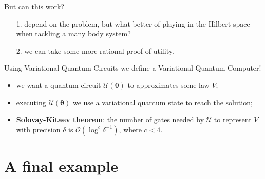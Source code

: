 \documentclass[8pt, xcolor={svgnames}, hyperref={linkcolor=amethyst}]{beamer}
\begin{document}
\begin{frame}{But can this work?}
\pause
\begin{itemize}[noitemsep]
\item[1.] depend on the problem\pause, but what better of playing in the Hilbert space 
when tackling a many body system?
\pause
\item[2.] we can take some more rational proof of utility.
\end{itemize}
\pause
Using Variational Quantum Circuits we define a Variational Quantum Computer!
\pause
\begin{multicols}{2}
\begin{itemize}
\item<7,8,9>[1.] we want a quantum circuit $\mathcal{U}(\bm{\theta})$ to approximates some law $V$;
\item<8,9>[2.] executing $\mathcal{U}(\bm{\theta})$ we use a variational quantum state
to reach the solution;
\item<9>[3.] \textbf{Solovay-Kitaev theorem}: the number of gates needed by $\mathcal{U}$ to 
represent $V$ with precision $\delta$ is $\mathcal{O}(\log^c \delta^{-1})$, where
$c<4$.
\end{itemize}
\begin{figure}
\end{figure}
\end{multicols}
\end{frame}

\section{A final example}
\end{document}
